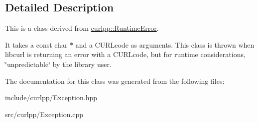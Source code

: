 \subsection{Detailed Description}
This is a class derived from \hyperlink{classcurlpp_1_1RuntimeError}{curlpp\-::\-Runtime\-Error}. 

It takes a const char $\ast$ and a C\-U\-R\-Lcode as arguments. This class is thrown when libcurl is returning an error with a C\-U\-R\-Lcode, but for runtime considerations, \char`\"{}unpredictable\char`\"{} by the library user. 

The documentation for this class was generated from the following files\-:\begin{DoxyCompactItemize}
\item 
include/curlpp/Exception.\-hpp\item 
src/curlpp/Exception.\-cpp\end{DoxyCompactItemize}
